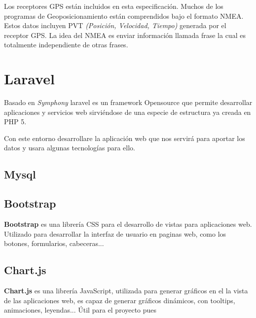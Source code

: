 Los receptores GPS están incluidos en esta especificación. Muchos de los programas de Geoposicionamiento están comprendidos bajo el formato NMEA. Estos datos incluyen PVT \textit{(Posición, Velocidad, Tiempo) }generada por el receptor GPS. La idea del NMEA es enviar información llamada frase la cual es totalmente independiente de otras frases.

\section{Laravel}

Basado en \textit{Symphony} laravel es un framework Opensource que permite desarrollar aplicaciones y servicios web sirviéndose de una especie de estructura ya creada en PHP 5.

Con este entorno desarrollare la aplicación web que nos servirá para aportar  los datos y usara algunas tecnologías para ello.

\subsection{Mysql}

\subsection{Bootstrap}

\textbf{Bootstrap} es una librería  CSS para el desarrollo de vistas para aplicaciones web. Utilizado para desarrollar la interfaz de usuario en paginas web, como los botones, formularios, cabeceras...

\subsection{Chart.js}

\textbf{Chart.js} es una librería JavaScript, utilizada para generar gráficos en el la vista de las aplicaciones web, es capaz de generar gráficos dinámicos, con tooltips, animaciones, leyendas... Útil para el proyecto pues 



